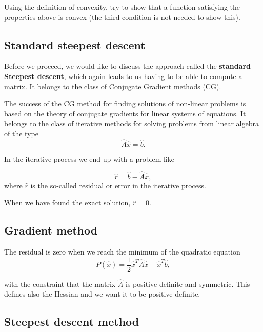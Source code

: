 \documentclass[%
oneside,                 %
final,                   %
10pt]{article}
\begin{document}
\noindent
Using the definition of convexity, try to show that a function satisfying the properties above is convex (the third condition is not needed to show this).

\subsection*{Standard steepest descent}

Before we proceed, we would like to discuss the approach called the
\textbf{standard Steepest descent}, which again leads to us having to be able
to compute a matrix. It belongs to the class of Conjugate Gradient methods (CG).

\href{{https://www.cs.cmu.edu/~quake-papers/painless-conjugate-gradient.pdf}}{The success of the CG method}
for finding solutions of non-linear problems is based on the theory
of conjugate gradients for linear systems of equations. It belongs to
the class of iterative methods for solving problems from linear
algebra of the type 
\begin{equation*} 
\hat{A}\hat{x} = \hat{b}.
\end{equation*} 

In the iterative process we end up with a problem like

\begin{equation*}
  \hat{r}= \hat{b}-\hat{A}\hat{x},
\end{equation*}
where $\hat{r}$ is the so-called residual or error in the iterative process.

When we have found the exact solution, $\hat{r}=0$.

\subsection*{Gradient method}

The residual is zero when we reach the minimum of the quadratic equation
\begin{equation*}
  P(\hat{x})=\frac{1}{2}\hat{x}^T\hat{A}\hat{x} - \hat{x}^T\hat{b},
\end{equation*}

with the constraint that the matrix $\hat{A}$ is positive definite and
symmetric.  This defines also the Hessian and we want it to be  positive definite.  

\subsection*{Steepest descent  method}
\end{document}
